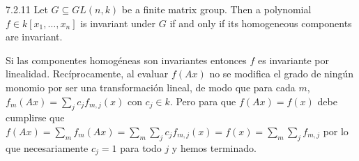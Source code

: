 \documentclass[twoside]{article}
\begin{document}
\newpage

\begin{ejercicio}{7.2.11}
Let $G ⊆ GL(n, k)$ be a finite matrix group. Then a polynomial
$f ∈ k[x_1, \dots , x_n]$ is invariant under $G$ if and only if its homogeneous components
are invariant.
\end{ejercicio}
\begin{solucion}
Si las componentes homogéneas son invariantes entonces $f$ es invariante por linealidad. Recíprocamente, al evaluar $f(Ax)$ no se modifica el grado de ningún monomio por ser una transformación lineal, de modo que para cada $m$, $f_m(Ax)=\sum_j c_jf_{m,j}(x)$ con $c_j\in k$. Pero para que $f(Ax)=f(x)$ debe cumplirse que $f(Ax)=\sum_m f_m(Ax)=\sum_m\sum_j c_jf_{m,j}(x)=f(x)=\sum_m\sum_j f_{m,j}$ por lo que necesariamente $c_j=1$ para todo $j$ y hemos terminado.

\end{solucion}

\newpage
\end{document}
